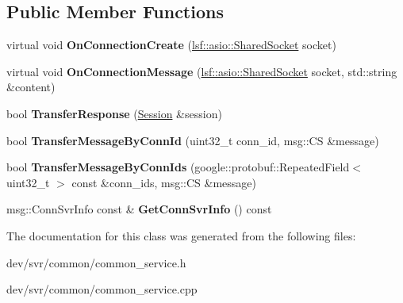 \subsection*{Public Member Functions}
\begin{DoxyCompactItemize}
\item 
\hypertarget{classConnectClientMsgTransferService_afc80b31293d9c1bfef22acae3f916703}{
virtual void {\bfseries OnConnectionCreate} (\hyperlink{classlsf_1_1asio_1_1SharedSocket}{lsf::asio::SharedSocket} socket)}
\label{classConnectClientMsgTransferService_afc80b31293d9c1bfef22acae3f916703}

\item 
\hypertarget{classConnectClientMsgTransferService_adbdcb840b413a8a07aefcc4316578b0a}{
virtual void {\bfseries OnConnectionMessage} (\hyperlink{classlsf_1_1asio_1_1SharedSocket}{lsf::asio::SharedSocket} socket, std::string \&content)}
\label{classConnectClientMsgTransferService_adbdcb840b413a8a07aefcc4316578b0a}

\item 
\hypertarget{classConnectClientMsgTransferService_aa3b277fb1458ff7c7c8805b26c48767c}{
bool {\bfseries TransferResponse} (\hyperlink{classSession}{Session} \&session)}
\label{classConnectClientMsgTransferService_aa3b277fb1458ff7c7c8805b26c48767c}

\item 
\hypertarget{classConnectClientMsgTransferService_aea5347df47d2114d22d4dd0c4ca6327e}{
bool {\bfseries TransferMessageByConnId} (uint32\_\-t conn\_\-id, msg::CS \&message)}
\label{classConnectClientMsgTransferService_aea5347df47d2114d22d4dd0c4ca6327e}

\item 
\hypertarget{classConnectClientMsgTransferService_a1b87d7d6ef8d465eefcb4aeaa9916ca5}{
bool {\bfseries TransferMessageByConnIds} (google::protobuf::RepeatedField$<$ uint32\_\-t $>$ const \&conn\_\-ids, msg::CS \&message)}
\label{classConnectClientMsgTransferService_a1b87d7d6ef8d465eefcb4aeaa9916ca5}

\item 
\hypertarget{classConnectClientMsgTransferService_ae0af4ee8000effaa9f2c93e3af207f51}{
msg::ConnSvrInfo const \& {\bfseries GetConnSvrInfo} () const }
\label{classConnectClientMsgTransferService_ae0af4ee8000effaa9f2c93e3af207f51}

\end{DoxyCompactItemize}


The documentation for this class was generated from the following files:\begin{DoxyCompactItemize}
\item 
dev/svr/common/common\_\-service.h\item 
dev/svr/common/common\_\-service.cpp\end{DoxyCompactItemize}
